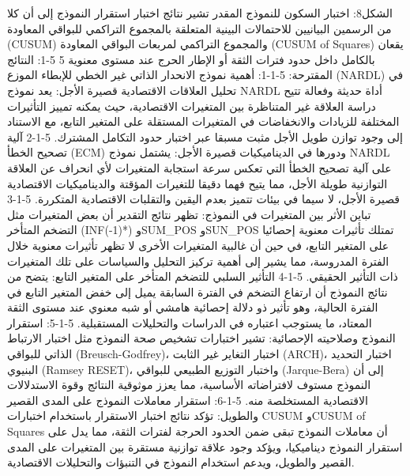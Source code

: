 \documentclass[12pt,a4paper]{report}
\begin{document}
	 الشكل8: اختبار السكون للنموذج المقدر
تشير نتائج اختبار استقرار النموذج إلى أن كلا من الرسمين البيانيين للاحتمالات البينية المتعلقة بالمجموع التراكمي للبواقي المعاودة (CUSUM) والمجموع التراكمي لمربعات البواقي المعاودة (CUSUM of Squares) يقعان بالكامل داخل حدود فترات الثقة أو الإطار الحرج عند مستوى معنوية 5%
5-1: النتائج المقترحة: 
5-1-1:  أهمية نموذج الانحدار الذاتي غير الخطي للإبطاء الموزع (NARDL) في تحليل العلاقات الاقتصادية قصيرة الأجل:
يعد نموذج NARDL أداة حديثة وفعالة تتيح دراسة العلاقة غير المتناظرة بين المتغيرات الاقتصادية، حيث يمكنه تمييز التأثيرات المختلفة للزيادات والانخفاضات في المتغيرات المستقلة على المتغير التابع، مع الاستناد إلى وجود توازن طويل الأجل مثبت مسبقا عبر اختبار حدود التكامل المشترك.
5-1-2  آلية تصحيح الخطأ (ECM) ودورها في الديناميكيات قصيرة الأجل:
يشتمل نموذج NARDL على آلية تصحيح الخطأ التي تعكس سرعة استجابة المتغيرات لأي انحراف عن العلاقة التوازنية طويلة الأجل، مما يتيح فهما دقيقا للتغيرات المؤقتة والديناميكيات الاقتصادية قصيرة الأجل، لا سيما في بيئات تتميز بعدم اليقين والتقلبات الاقتصادية المتكررة.
5-1-3 تباين الأثر بين المتغيرات في النموذج:
تظهر نتائج التقدير أن بعض المتغيرات مثل التضخم المتأخر (INF(-1)*) وSUM_POS وSUN_POS تمتلك تأثيرات معنوية إحصائيا على المتغير التابع، في حين أن غالبية المتغيرات الأخرى لا تظهر تأثيرات معنوية خلال الفترة المدروسة، مما يشير إلى أهمية تركيز التحليل والسياسات على تلك المتغيرات ذات التأثير الحقيقي.
5-1-4  التأثير السلبي للتضخم المتأخر على المتغير التابع:
يتضح من نتائج النموذج أن ارتفاع التضخم في الفترة السابقة يميل إلى خفض المتغير التابع في الفترة الحالية، وهو تأثير ذو دلالة إحصائية هامشي أو شبه معنوي عند مستوى الثقة المعتاد، ما يستوجب اعتباره في الدراسات والتحليلات المستقبلية.
5-1-5: استقرار النموذج وصلاحيته الإحصائية:
تشير اختبارات تشخيص صحة النموذج مثل اختبار الارتباط الذاتي للبواقي (Breusch-Godfrey)، اختبار التغاير غير الثابت (ARCH)، اختبار التحديد البنيوي (Ramsey RESET)، واختبار التوزيع الطبيعي للبواقي (Jarque-Bera) إلى أن النموذج مستوف لافتراضاته الأساسية، مما يعزز موثوقية النتائج وقوة الاستدلالات الاقتصادية المستخلصة منه.
5-1-6: استقرار معاملات النموذج على المدى القصير والطويل:
تؤكد نتائج اختبار الاستقرار باستخدام اختبارات CUSUM وCUSUM of Squares أن معاملات النموذج تبقى ضمن الحدود الحرجة لفترات الثقة، مما يدل على استقرار النموذج ديناميكيا، ويؤكد وجود علاقة توازنية مستقرة بين المتغيرات على المدى القصير والطويل، ويدعم استخدام النموذج في التنبؤات والتحليلات الاقتصادية.
\end{document}
